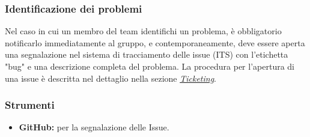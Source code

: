 \subsubsection{Identificazione dei problemi}
Nel caso in cui un membro del team identifichi un problema, è obbligatorio notificarlo immediatamente al gruppo, e contemporaneamente, deve essere aperta una segnalazione nel sistema di tracciamento delle issue (ITS) con l'etichetta "bug" e una descrizione completa del problema. La procedura per l'apertura di una issue è descritta nel dettaglio nella sezione \hyperlink{par:ticketing}{\textit{Ticketing}}.

\subsubsection{Strumenti}
\begin{itemize}
    \item \textbf{GitHub:} per la segnalazione delle Issue.
\end{itemize}